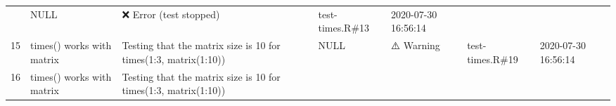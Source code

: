 \documentclass[
]{book}
\begin{document}
\begin{longtable}[]{@{}lllllll@{}}
\begin{minipage}[t]{0.25\columnwidth}
\end{minipage} & \begin{minipage}[t]{0.05\columnwidth}\raggedright
NULL\strut
\end{minipage} & \begin{minipage}[t]{0.22\columnwidth}\raggedright
❌ Error (test stopped)\strut
\end{minipage} & \begin{minipage}[t]{0.06\columnwidth}\raggedright
test-times.R\#13\strut
\end{minipage} & \begin{minipage}[t]{0.08\columnwidth}\raggedright
2020-07-30 16:56:14\strut
\end{minipage}\tabularnewline
\begin{minipage}[t]{0.01\columnwidth}\raggedright
15\strut
\end{minipage} & \begin{minipage}[t]{0.14\columnwidth}\raggedright
times() works with matrix\strut
\end{minipage} & \begin{minipage}[t]{0.25\columnwidth}\raggedright
Testing that the matrix size is 10 for times(1:3, matrix(1:10))\strut
\end{minipage} & \begin{minipage}[t]{0.05\columnwidth}\raggedright
NULL\strut
\end{minipage} & \begin{minipage}[t]{0.22\columnwidth}\raggedright
⚠️ Warning\strut
\end{minipage} & \begin{minipage}[t]{0.06\columnwidth}\raggedright
test-times.R\#19\strut
\end{minipage} & \begin{minipage}[t]{0.08\columnwidth}\raggedright
2020-07-30 16:56:14\strut
\end{minipage}\tabularnewline
\begin{minipage}[t]{0.01\columnwidth}\raggedright
16\strut
\end{minipage} & \begin{minipage}[t]{0.14\columnwidth}\raggedright
times() works with matrix\strut
\end{minipage} & \begin{minipage}[t]{0.25\columnwidth}\raggedright
Testing that the matrix size is 10 for times(1:3, matrix(1:10))\strut
\end{minipage} & \begin{minipage}[t]{0.05\columnwidth}\raggedright

\end{minipage}
\end{longtable}
\end{document}
